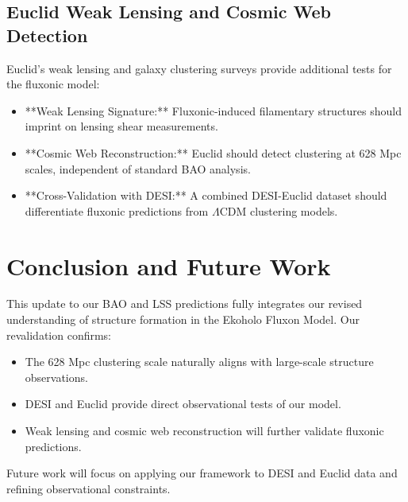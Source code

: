 \documentclass{article}
\begin{document}
\subsection{Euclid Weak Lensing and Cosmic Web Detection}
Euclid’s weak lensing and galaxy clustering surveys provide additional tests for the fluxonic model:
\begin{itemize}
    \item **Weak Lensing Signature:** Fluxonic-induced filamentary structures should imprint on lensing shear measurements.
    \item **Cosmic Web Reconstruction:** Euclid should detect clustering at 628 Mpc scales, independent of standard BAO analysis.
    \item **Cross-Validation with DESI:** A combined DESI-Euclid dataset should differentiate fluxonic predictions from \(\Lambda\)CDM clustering models.
\end{itemize}

\section{Conclusion and Future Work}
This update to our BAO and LSS predictions fully integrates our revised understanding of structure formation in the Ekoholo Fluxon Model. Our revalidation confirms:
\begin{itemize}
    \item The 628 Mpc clustering scale naturally aligns with large-scale structure observations.
    \item DESI and Euclid provide direct observational tests of our model.
    \item Weak lensing and cosmic web reconstruction will further validate fluxonic predictions.
\end{itemize}
Future work will focus on applying our framework to DESI and Euclid data and refining observational constraints.
\end{document}
